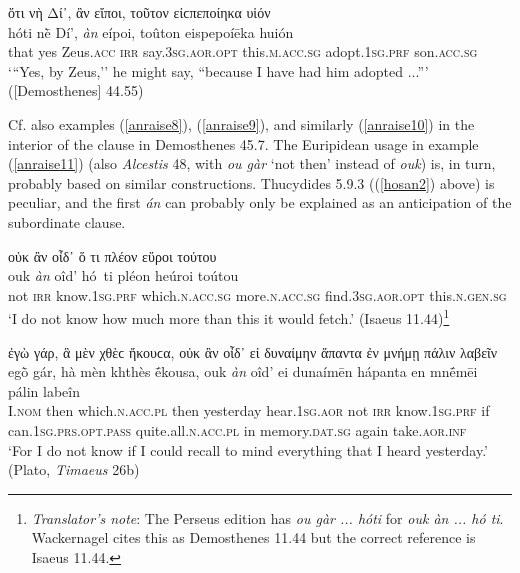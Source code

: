\begin{exe}
\ex ὅτι νὴ Δί᾽, ἂν εἴποι, τοῦτον εἰϲπεποίηκα υἱόν\\
\gll hóti nḕ Dí', \emph{àn} eípoi, toûton eispepoíēka huión\\
that yes Zeus.\textsc{acc} \textsc{irr} say.\textsc{3sg.aor.opt} this.\textsc{m.acc.sg} adopt.\textsc{1sg.prf} son.\textsc{acc.sg}\\
\trans `{``}Yes, by Zeus,'' he might say, ``because I have had him adopted ...''' ({[}Demosthenes{]} 44.55)
\label{anraise7}
\end{exe}

Cf. also examples (\ref{anraise8}), (\ref{anraise9}), and similarly (\ref{anraise10}) in the interior of the clause in Demosthenes 45.7. The Euripidean usage in example (\ref{anraise11}) (also \textit{Alcestis} 48, with \textit{ou gàr} `not then' instead of \textit{ouk}) is, in turn, probably based on similar constructions. Thucydides 5.9.3 ((\ref{hosan2}) above) is peculiar, and the first \emph{án} can probably only be explained as an anticipation of the subordinate clause.

\begin{exe}
\ex οὐκ ἂν οἶδ᾽ ὅ τι πλέον εὕροι τούτου\\
\gll ouk \emph{àn} oîd' hó~ti pléon heúroi toútou\\
not \textsc{irr} know.\textsc{1sg.prf} which.\textsc{n.acc.sg} more.\textsc{n.acc.sg} find.\textsc{3sg.aor.opt} this.\textsc{n.gen.sg}\\
\trans `I do not know how much more than this it would fetch.' (Isaeus 11.44)\footnote{\emph{Translator's note}: The Perseus edition has \textit{ou gàr ... hóti} for \textit{ouk àn ... hó ti}. Wackernagel cites this as Demosthenes 11.44 but the correct reference is Isaeus 11.44.}
\label{anraise8}
\end{exe}

\begin{exe}
\ex ἐγὼ γάρ, ἃ μὲν χθὲϲ ἤκουϲα, οὐκ ἂν οἶδ᾽ εἰ δυναίμην ἅπαντα ἐν μνήμῃ πάλιν λαβεῖν\\
\gll egṑ gár, hà mèn khthès ḗkousa, ouk \emph{àn} oîd' ei dunaímēn hápanta en mnḗmēi pálin labeîn\\
I.\textsc{nom} then which.\textsc{n.acc.pl} then yesterday hear.\textsc{1sg.aor} not \textsc{irr} know.\textsc{1sg.prf} if can.\textsc{1sg.prs.opt.pass} quite.all.\textsc{n.acc.pl} in memory.\textsc{dat.sg} again take.\textsc{aor.inf}\\
\trans `For I do not know if I could recall to mind everything that I heard yesterday.' (Plato, \textit{Timaeus} 26b)
\label{anraise9}
\end{exe}

